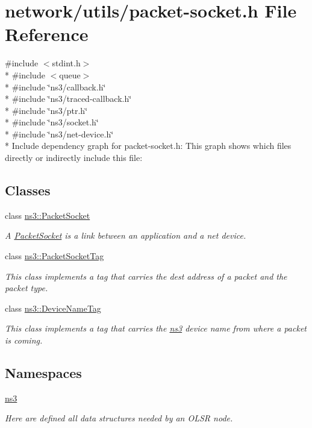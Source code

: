 \hypertarget{packet-socket_8h}{}\section{network/utils/packet-\/socket.h File Reference}
\label{packet-socket_8h}
{\ttfamily \#include $<$stdint.\+h$>$}\\*
{\ttfamily \#include $<$queue$>$}\\*
{\ttfamily \#include \char`\"{}ns3/callback.\+h\char`\"{}}\\*
{\ttfamily \#include \char`\"{}ns3/traced-\/callback.\+h\char`\"{}}\\*
{\ttfamily \#include \char`\"{}ns3/ptr.\+h\char`\"{}}\\*
{\ttfamily \#include \char`\"{}ns3/socket.\+h\char`\"{}}\\*
{\ttfamily \#include \char`\"{}ns3/net-\/device.\+h\char`\"{}}\\*
Include dependency graph for packet-\/socket.h\+:
This graph shows which files directly or indirectly include this file\+:
\subsection*{Classes}
\begin{DoxyCompactItemize}
\item 
class \hyperlink{classns3_1_1PacketSocket}{ns3\+::\+Packet\+Socket}
\begin{DoxyCompactList}\small\item\em A \hyperlink{classns3_1_1PacketSocket}{Packet\+Socket} is a link between an application and a net device. \end{DoxyCompactList}\item 
class \hyperlink{classns3_1_1PacketSocketTag}{ns3\+::\+Packet\+Socket\+Tag}
\begin{DoxyCompactList}\small\item\em This class implements a tag that carries the dest address of a packet and the packet type. \end{DoxyCompactList}\item 
class \hyperlink{classns3_1_1DeviceNameTag}{ns3\+::\+Device\+Name\+Tag}
\begin{DoxyCompactList}\small\item\em This class implements a tag that carries the \hyperlink{namespacens3}{ns3} device name from where a packet is coming. \end{DoxyCompactList}\end{DoxyCompactItemize}
\subsection*{Namespaces}
\begin{DoxyCompactItemize}
\item 
 \hyperlink{namespacens3}{ns3}
\begin{DoxyCompactList}\small\item\em Here are defined all data structures needed by an O\+L\+SR node. \end{DoxyCompactList}\end{DoxyCompactItemize}

